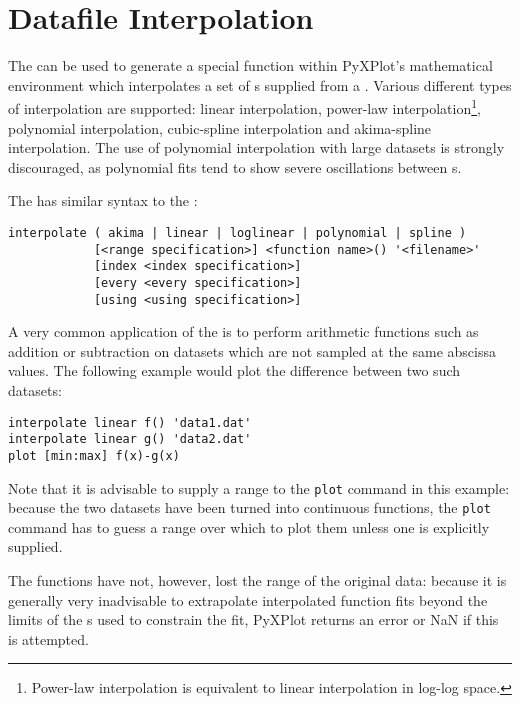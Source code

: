 \section{Datafile Interpolation}
\label{sec:spline_command}

The  can be used to generate a special function within
PyXPlot's mathematical environment which interpolates a set of \datapoint s
supplied from a \datafile.  Various different types of interpolation are
supported: linear interpolation, power-law interpolation\footnote{Power-law
interpolation is equivalent to linear interpolation in log-log space.},
polynomial interpolation, cubic-spline interpolation and akima-spline
interpolation. The use of polynomial interpolation with large datasets is
strongly discouraged, as polynomial fits tend to show severe oscillations
between \datapoint s.

The  has similar syntax to the :

\begin{verbatim}
interpolate ( akima | linear | loglinear | polynomial | spline )
            [<range specification>] <function name>() '<filename>' 
            [index <index specification>]
            [every <every specification>]
            [using <using specification>]
\end{verbatim}

A very common application of the  is to perform arithmetic
functions such as addition or subtraction on datasets which are not sampled at
the same abscissa values. The following example would plot the difference
between two such datasets:

\begin{verbatim}
interpolate linear f() 'data1.dat'
interpolate linear g() 'data2.dat'
plot [min:max] f(x)-g(x)
\end{verbatim}

\noindent Note that it is advisable to supply a range to the {\tt plot} command
in this example: because the two datasets have been turned into continuous
functions, the {\tt plot} command has to guess a range over which to plot them
unless one is explicitly supplied.

The functions have not, however, lost the range of the original data: because
it is generally very inadvisable to extrapolate interpolated function fits
beyond the limits of the \datapoint s used to constrain the fit, PyXPlot returns
an error or NaN if this is attempted.

